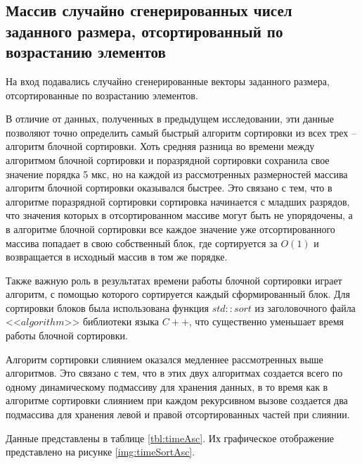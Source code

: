 \subsection{Массив случайно сгенерированных чисел заданного размера, отсортированный по возрастанию элементов}

На вход подавались случайно сгенерированные векторы заданного размера, отсортированные по возрастанию элементов.

В отличие от данных, полученных в предыдущем исследовании, эти данные позволяют точно определить самый быстрый алгоритм сортировки из всех трех -- алгоритм блочной сортировки. Хоть средняя разница во времени между алгоритмом блочной сортировки и поразрядной сортировки сохранила свое значение порядка 5 мкс, но на каждой из рассмотренных размерностей массива алгоритм блочной сортировки оказывался быстрее. Это связано с тем, что в алгоритме поразрядной сортировки сортировка начинается с младших разрядов, что значения которых в отсортированном массиве могут быть не упорядочены, а в алгоритме блочной сортировки все каждое значение уже отсортированного массива попадает в свою собственный блок, где сортируется за $O(1)$ и возвращается в исходный массив в том же порядке.

Также важную роль в результатах времени работы блочной сортировки играет алгоритм, с помощью которого сортируется каждый сформированный блок. Для сортировки блоков была использована функция $std::sort$ из заголовочного файла <<$algorithm$>> библиотеки языка $C++$, что существенно уменьшает время работы блочной сортировки.

Алгоритм сортировки слиянием оказался медленнее рассмотренных выше алгоритмов. Это связано с тем, что в этих двух алгоритмах создается всего по одному динамическому подмассиву для хранения данных, в то время как в алгоритме сортировки слиянием при каждом рекурсивном вызове создается два подмассива для хранения левой и правой отсортированных частей при слиянии.

Данные представлены в таблице \ref{tbl:timeAsc}. Их графическое отображение представлено на рисунке \ref{img:timeSortAsc}.

